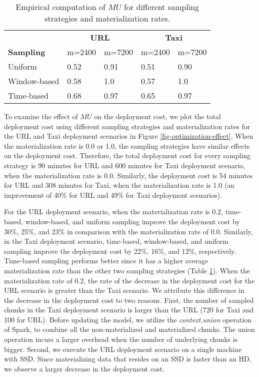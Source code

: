 \begin{table}
\begin{tabular}{lllll}
\hline
& \multicolumn{2}{c}{\textbf{URL}}  & \multicolumn{2}{c}{\textbf{Taxi}} \\
 \cmidrule(lr){2-3} \cmidrule(lr){4-5} 
\textbf{Sampling}  & \multicolumn{1}{l}{m=2400} & \multicolumn{1}{l}{m=7200} 
 &  \multicolumn{1}{l}{m=2400} & \multicolumn{1}{l}{m=7200}  \\
\hline
Uniform      	&  0.52 & 0.91 & 0.51 & 0.90 \\
Window-based &  0.58 	& 1.0 & 0.57 & 1.0 \\
Time-based &   0.68 	&  0.97 & 0.65 & 0.97 \\ \hline      
\end{tabular}
\caption{Empirical computation of $MU$ for different sampling strategies and materialization rates.}
\label{table-empirical-mu}
 \vspace{-31pt}
\end{table}
To examine the effect of $MU$ on the deployment cost, we plot the total deployment cost using different sampling strategies and materialization rates for the URL and Taxi deployment scenarios in Figure \ref{fig-optimization-effect}.
When the materialization rate is 0.0 or 1.0, the sampling strategies have similar effects on the deployment cost. 
Therefore, the total deployment cost for every sampling strategy is 90 minutes for URL and 600 minutes for Taxi deployment scenario, when the materialization rate is 0.0.
Similarly, the deployment cost is 54 minutes for URL and 308 minutes for Taxi, when the materialization rate is 1.0 (an improvement of 40\% for URL and 49\% for Taxi deployment scenarios).

For the URL deployment scenario, when the materialization rate is 0.2, time-based, window-based, and uniform sampling improve the deployment cost by 30\%, 25\%, and 23\% in comparison with the materialization rate of 0.0.
Similarly, in the Taxi deployment scenario, time-based, window-based, and uniform sampling improve the deployment cost by 22\%, 16\%, and 12\%, respectively. 
Time-based sampling performs better since it has a higher average materialization rate than the other two sampling strategies (Table \ref{table-empirical-mu}).
When the materialization rate of 0.2, the rate of the decrease in the deployment cost for the URL scenario is greater than the Taxi scenario.
We attribute this difference in the decrease in the deployment cost to two reasons.
First, the number of sampled chunks in the Taxi deployment scenario is larger than the URL (720 for Taxi and 100 for URL).
Before updating the model, we utilize the \textit{context.union} operation of Spark, to combine all the non-materialized and materialized chunks.
The union operation incurs a larger overhead when the number of underlying chunks is bigger.
Second, we execute the URL deployment scenario on a single machine with SSD.
Since materializing data that resides on an SSD is faster than an HD, we observe a larger decrease in the deployment cost.

